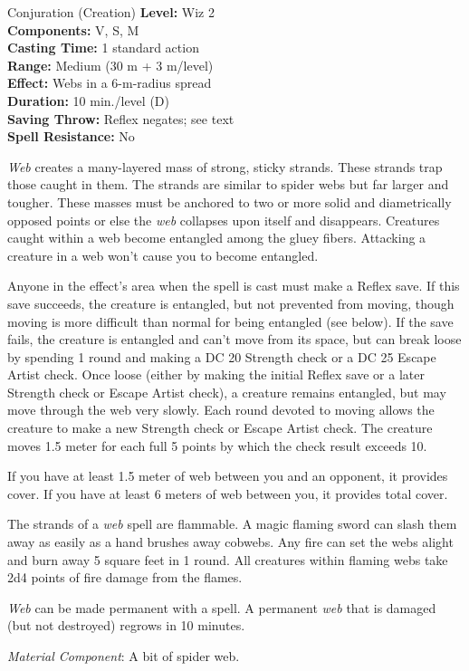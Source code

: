 {Conjuration (Creation)}
{
	\textbf{Level:}
	Wiz 2\\
	\textbf{Components:}
	V, S, M\\
	\textbf{Casting Time:}
	1 standard action\\
	\textbf{Range:}
	Medium (30 m + 3 m/level)\\
	\textbf{Effect:}
	Webs in a 6-m-radius spread\\
	\textbf{Duration:}
	10 min./level (D)\\
	\textbf{Saving Throw:}
	Reflex negates; see text\\
	\textbf{Spell Resistance:}
	No\\
}
{
	\emph{Web} creates a many-layered mass of strong, sticky strands. These strands trap those caught in them. The strands are similar to spider webs but far larger and tougher. These masses must be anchored to two or more solid and diametrically opposed points or else the \emph{web} collapses upon itself and disappears. Creatures caught within a web become entangled among the gluey fibers. Attacking a creature in a web won't cause you to become entangled.

	Anyone in the effect's area when the spell is cast must make a Reflex save. If this save succeeds, the creature is entangled, but not prevented from moving, though moving is more difficult than normal for being entangled (see below). If the save fails, the creature is entangled and can't move from its space, but can break loose by spending 1 round and making a DC 20 Strength check or a DC 25 Escape Artist check. Once loose (either by making the initial Reflex save or a later Strength check or Escape Artist check), a creature remains entangled, but may move through the web very slowly. Each round devoted to moving allows the creature to make a new Strength check or Escape Artist check. The creature moves 1.5 meter for each full 5 points by which the check result exceeds 10.

	If you have at least 1.5 meter of web between you and an opponent, it provides cover. If you have at least 6 meters of web between you, it provides total cover.

	The strands of a \emph{web} spell are flammable. A magic flaming sword can slash them away as easily as a hand brushes away cobwebs. Any fire can set the webs alight and burn away 5 square feet in 1 round. All creatures within flaming webs take 2d4 points of fire damage from the flames.

	\emph{Web} can be made permanent with a  spell. A permanent \emph{web} that is damaged (but not destroyed) regrows in 10 minutes.

	\textit{Material Component}:
	A bit of spider web.

}
